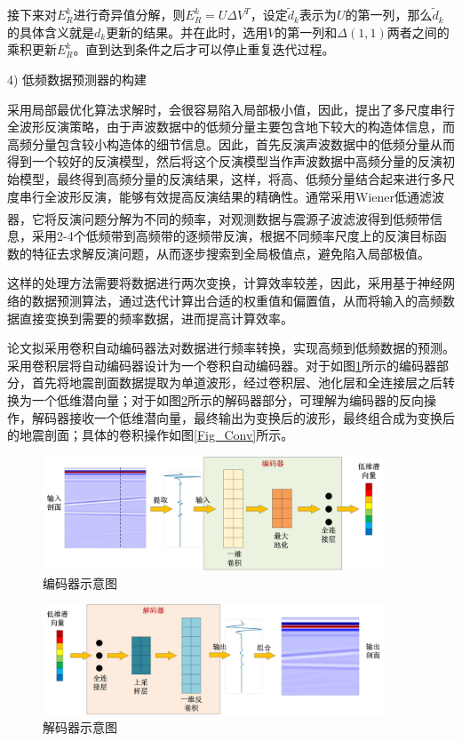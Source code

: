 \documentclass[11pt]{article}
\newcommand{\upcite}[1]{\textsuperscript{\textsuperscript{\cite{#1}}}}
\begin{document}
\par
接下来对$E_R^k$进行奇异值分解，则$E_R^k=U \Delta V^T$，设定$\tilde{d}_k$表示为$U$的第一列，那么$\tilde{d}_k$的具体含义就是$d_k$更新的结果。并在此时，选用$V$的第一列和$\Delta (1,1)$两者之间的乘积更新$E_R^k$。直到达到条件之后才可以停止重复迭代过程。
\par
4) 低频数据预测器的构建
\par
采用局部最优化算法求解时，会很容易陷入局部极小值，因此，提出了多尺度串行全波形反演策略，由于声波数据中的低频分量主要包含地下较大的构造体信息，而高频分量包含较小构造体的细节信息。因此，首先反演声波数据中的低频分量从而得到一个较好的反演模型，然后将这个反演模型当作声波数据中高频分量的反演初始模型，最终得到高频分量的反演结果，这样，将高、低频分量结合起来进行多尺度串行全波形反演，能够有效提高反演结果的精确性。通常采用Wiener低通滤波器\upcite{Hansen1989,Portilla2001,King1984}，它将反演问题分解为不同的频率，对观测数据与震源子波滤波得到低频带信息，采用2-4个低频带到高频带的逐频带反演，根据不同频率尺度上的反演目标函数的特征去求解反演问题，从而逐步搜索到全局极值点，避免陷入局部极值。
\par
这样的处理方法需要将数据进行两次变换，计算效率较差，因此，采用基于神经网络的数据预测算法，通过迭代计算出合适的权重值和偏置值，从而将输入的高频数据直接变换到需要的频率数据，进而提高计算效率。
\par
论文拟采用卷积自动编码器法对数据进行频率转换，实现高频到低频数据的预测。采用卷积层将自动编码器设计为一个卷积自动编码器。对于如图\ref{Fig_Encoder}所示的编码器部分，首先将地震剖面数据提取为单道波形，经过卷积层、池化层和全连接层之后转换为一个低维潜向量；对于如图\ref{Fig_Decoder}所示的解码器部分，可理解为编码器的反向操作，解码器接收一个低维潜向量，最终输出为变换后的波形，最终组合成为变换后的地震剖面；具体的卷积操作如图\ref{Fig_Conv}所示。
\par
\begin{figure}[htbp]
\centering
\includegraphics[width=4in]{./FigureFolder/Predict/Encoder.pdf}
\caption{编码器示意图}
\label{Fig_Encoder}
\end{figure}

\begin{figure}[htbp]
\centering
\includegraphics[width=4in]{./FigureFolder/Predict/Decoder.pdf}
\caption{解码器示意图}
\label{Fig_Decoder}
\end{figure}
\end{document}
